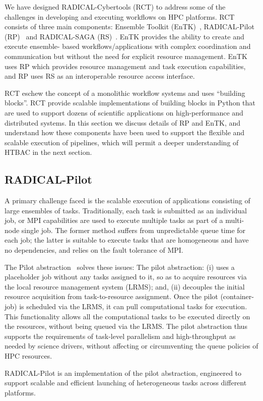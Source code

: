 
We have designed RADICAL-Cybertools (RCT) to address some of the challenges in
developing and executing workflows on HPC platforms. RCT consists of three
main components: Ensemble Toolkit (EnTK)~\cite{balasubramanian2016ensemble},
RADICAL-Pilot (RP)~\cite{merzky2015radical} and RADICAL-SAGA
(RS)~\cite{saga-x}. EnTK provides the ability to create and execute ensemble-
based workflows/applications with complex coordination and communication but
without the need for explicit resource management. EnTK uses RP which provides
resource management and task execution capabilities, and RP uses RS as an
interoperable resource access  interface. 

RCT eschew the concept of a monolithic workflow systems and uses ``building
blocks''. RCT provide scalable implementations of building blocks in Python
that are used to support dozens of scientific applications on high-performance
and distributed systems. In this section we discuss details of RP and EnTK,
and understand how these components have been used to support the flexible and
scalable execution of pipelines, which will permit a deeper understanding of
HTBAC in the next section.



\subsection{RADICAL-Pilot}

A primary challenge faced is the scalable execution of applications
consisting of large ensembles of tasks.  Traditionally, each task is
submitted as an individual job, or MPI capabilities are used to  execute
multiple tasks as part of a multi-node single job. The former method suffers
from unpredictable queue time for each job; the latter is suitable to execute
tasks that are homogeneous and have no dependencies, and relies on the fault
tolerance of MPI\@.

The Pilot abstraction~\cite{turilli2017comprehensive} solves these issues:
The pilot abstraction: (i) uses a placeholder job without any tasks assigned
to it, so as to acquire resources via the local resource management system
(LRMS); and, (ii) decouples the initial resource acquisition from
task-to-resource assignment. Once the pilot (container-job) is scheduled via
the LRMS, it can pull computational tasks for execution. This functionality
allows all the computational tasks to be executed directly on the resources,
without being queued via the LRMS\@. %
The pilot abstraction thus supports the requirements of task-level
parallelism and high-throughput as needed by science drivers, without
affecting or circumventing the queue policies of HPC resources.

RADICAL-Pilot is an implementation of the pilot abstraction, engineered to
support scalable and efficient launching of heterogeneous tasks across
different platforms.